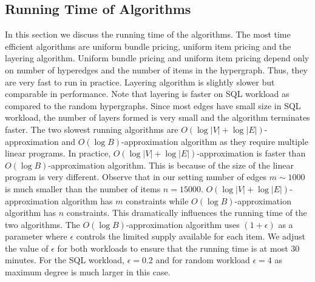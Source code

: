  
 \subsection{Running Time of Algorithms}
 
 In this section we discuss the running time of the algorithms. The most time efficient algorithms are uniform bundle pricing, uniform item pricing and the layering algorithm. Uniform bundle pricing and uniform item pricing depend only on number of hyperedges and the number of items in the hypergraph. Thus, they are very fast to run in practice. Layering algorithm is slightly slower but comparable in performance. Note that layering is faster on SQL workload as compared to the random hypergraphs. Since most edges have small size in SQL workload, the number of layers formed is very small and the algorithm terminates faster. The two slowest running algorithms are $O(\log |V| + \log |E|)$-approximation and $O(\log B)$-approximation algorithm as they require multiple linear programs. In practice, $O(\log |V| + \log |E|)$-approximation is faster than $O(\log B)$-approximation algorithm. This is because of the size of the linear program is very different. Observe that in our setting number of edges $m \sim 1000$ is much smaller than the number of items $n = 15000$. $O(\log |V| + \log |E|)$-approximation algorithm has $m$ constraints while $O(\log B)$-approximation algorithm has $n$ constraints. This dramatically influences the running time of the two algorithms. The $O(\log B)$-approximation algorithm uses $(1+\epsilon)$ as a parameter where $\epsilon$ controls the limited supply available for each item. We adjust the value of $\epsilon$ for both workloads to ensure that the running time is at most $30$ minutes. For the SQL workload, $\epsilon = 0.2$ and for random workload $\epsilon = 4$ as maximum degree is much larger in this case.
 